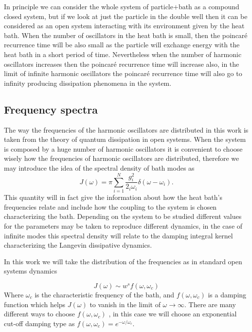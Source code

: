 In principle we can consider the whole system of particle$+$bath as a compound closed system, but if we look at just the particle in the double well then it can be considered as an open system interacting with its environment given by the heat bath. When the number of oscillators in the heat bath is small, then the poincaré recurrence time will be also small as the particle will exchange energy with the heat bath in a short period of time. Nevertheless when the number of harmonic oscillators increases then the poincaré recurrence time will increase also, in the limit of infinite harmonic oscillators the poincaré recurrence time will also go to infinity producing dissipation phenomena in the system\cite{mazur1960poincare}.


\subsection{Frequency spectra}
The way the frequencies of the harmonic oscillators are distributed in this work is taken from the theory of quantum dissipation in open systems.  When the system is composed by a huge number of harmonic oscillators it is convenient to choose wisely how the frequencies of harmonic oscillators are distributed, therefore we may introduce the idea of the spectral density of bath modes as
\begin{equation}
J(\omega) =\pi \sum_{i=1}^N\frac{g_i^2}{2_i\omega_i}\delta (\omega-\omega_i).
\end{equation}
This quantity will in fact give the information about how the heat bath's frequencies relate and include how the coupling to the system is chosen characterizing the bath. Depending on the system to be studied different values for the parameters may be taken to reproduce different dynamics, in the case of infinite modes this spectral density will relate to the damping integral kernel characterizing the Langevin dissipative dynamics.\par 
In this work we will take the distribution of the frequencies as in standard open systems dynamics\cite{leggett1987dynamics} \cite{wang2010coherent}\cite{wang2008coherent}

\begin{equation}
J(\omega) \sim w^s f(\omega,\omega_c)
\label{eq:spectral_density}
\end{equation}
Where $\omega_c$ is the characteristic frequency of the bath, and $f(\omega,\omega_c)$ is a damping function which helps $J(\omega)$ to vanish in the limit of $\omega \rightarrow \infty$. There are many different ways to choose $f(\omega,\omega_c)$ \cite{wang2008coherent}, in this case we will choose an exponential cut-off damping type as $f(\omega,\omega_c)=e^{-\omega/\omega_c}$.   

